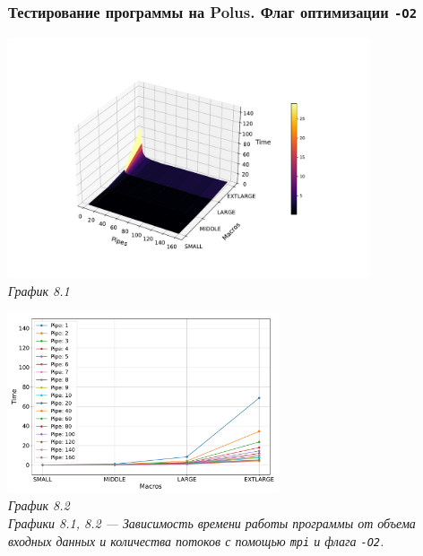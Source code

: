 \documentclass[a4paper, 11pt]{article}
\begin{document}
\subsubsection*{Тестирование программы на Polus. Флаг оптимизации \texttt{-O2}}
\begin{center}
    \includegraphics[width=0.8\textwidth]{../graph/mpi_o2.pdf} \\
    \small \it
    График 8.1
\end{center}

\begin{center}
    \includegraphics[width=0.6\textwidth]{../graph/mpi_o21.pdf} \\
    \small \it
    График 8.2\\ Графики 8.1, 8.2  --- Зависимость времени работы программы от объема входных данных и количества потоков с помощью \texttt{mpi} и флага \texttt{-O2}.
\end{center}
\end{document}

